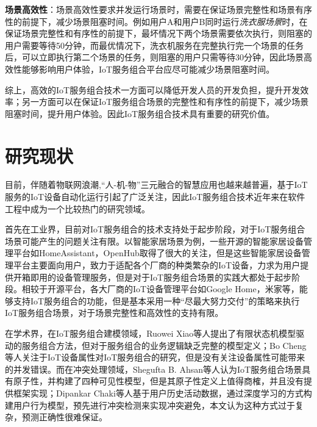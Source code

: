 \documentclass[winfonts,master,twoside]{njuthesis}
\begin{document}
\textbf{场景高效性}：场景高效性要求并发运行场景时，需要在保证场景完整性和场景有序性的前提下，减少场景阻塞时间。例如用户A和用户B同时运行\textit{洗衣服场景}时，在保证场景完整性和有序性的前提下，最坏情况下两个场景需要依次执行，则阻塞的用户需要等待50分钟，而最优情况下，洗衣机服务在完整执行完一个场景的任务后，可以立即执行第二个场景的任务，则阻塞的用户只需等待30分钟，因此场景高效性能够影响用户体验，IoT服务组合平台应尽可能减少场景阻塞时间。


综上，高效的IoT服务组合技术一方面可以降低开发人员的开发负担，提升开发效率；另一方面可以在保证IoT服务组合场景的完整性和有序性的前提下，减少场景阻塞时间，提升用户体验。因此IoT服务组合技术具有重要的研究价值。

\section{研究现状}\label{subsec:mptcp_conges}
目前，伴随着物联网浪潮,“人-机-物”三元融合的智慧应用也越来越普遍，基于IoT服务的IoT设备自动化运行引起了广泛关注，因此IoT服务组合技术近年来在软件工程中成为一个比较热门的研究领域。

首先在工业界，目前对IoT服务组合的技术支持处于起步阶段，对于IoT服务组合场景可能产生的问题关注有限。以智能家居场景为例，一些开源的智能家居设备管理平台如HomeAssistant\cite{homeassistant}，OpenHub\cite{soldatos2015openiot}取得了很大的关注，但是这些智能家居设备管理平台主要面向用户，致力于适配各个厂商的种类繁杂的IoT设备，力求为用户提供开箱即用的设备管理服务，但是对于IoT服务组合场景的实践大都处于起步阶段。相较于开源平台，各大厂商的IoT设备管理平台如Google Home，米家等，能够支持IoT服务组合的功能，但是基本采用一种“尽最大努力交付”的策略来执行IoT服务组合场景，对于场景完整性和高效性的支持有限。

在学术界，在IoT服务组合建模领域，Ruowei Xiao\cite{xiao2019finite}等人提出了有限状态机模型驱动的服务组合方法，但对于服务组合的业务逻辑缺乏完整的模型定义；Bo Cheng\cite{cheng2016situation}等人关注于IoT设备属性对IoT服务组合的研究，但是没有关注设备属性可能带来的并发错误。而在冲突处理领域，Shegufta B. Ahsan\cite{ahsan2021home}等人认为IoT服务组合场景具有原子性，并构建了四种可见性模型，但是其原子性定义上值得商榷，并且没有提供框架实现；Dipankar Chaki\cite{chaki2020conflict}等人基于用户历史活动数据，通过深度学习的方式构建用户行为模型，预先进行冲突检测来实现冲突避免，本文认为这种方式过于复杂，预测正确性很难保证。
\end{document}
